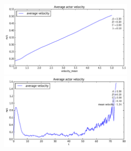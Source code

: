 \includegraphics[width=0.5\textwidth]{Figures/plots/square_room-velocity-aggr-velocity_mean.pdf}
\includegraphics[width=0.5\textwidth]{Figures/plots/square_room-velocity.pdf}

